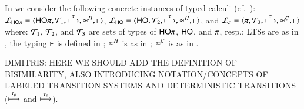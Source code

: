 \smallskip

In  %
we consider the following concrete instances of typed calculi (cf.~): \\
%
	$\mathcal{L}_{\mathsf{HO}\pi}=\langle \mathsf{HO}\pi, {\cal{T}}_1, \stackrel{\tau}{\longmapsto}, \approx^H, \vdash \rangle$,
	$\mathcal{L}_{\mathsf{HO}}=\langle \mathsf{HO}, {\cal{T}}_2, \stackrel{\tau}{\longmapsto}, \approx^H, \vdash \rangle$, and
	$\mathcal{L}_{\pi}=\langle \pi, {\cal{T}}_3, \stackrel{\tau}{\longmapsto}, \approx^C, \vdash \rangle$ 
%
where: 
${\cal{T}}_1$, ${\cal{T}}_2$, 
and ${\cal{T}}_3$
are sets of types of $\mathsf{HO}\pi$, $\mathsf{HO}$, and $\pi$, resp.;
LTSs are as in , 
the typing $\vdash$ is defined in 
;  
$\approx^H$ is as in ; 
$\approx^C$ is as in .

DIMITRIS: HERE WE SHOULD ADD THE DEFINITION OF BISIMILARITY, ALSO INTRODUCING NOTATION/CONCEPTS OF LABELED TRANSITION SYSTEMS
AND DETERMINISTIC TRANSITIONS ($\stackrel{\tau_{\beta}}{\longmapsto}$ and $\stackrel{\tau_{s}}{\longmapsto}$).


